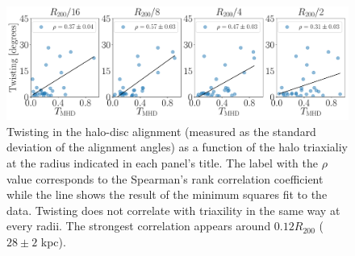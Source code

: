 \documentclass[usenatbib]{mnras}
\begin{document}
\begin{figure}
\begin{center}
\includegraphics[width=1.0\textwidth]{correlations_twisting_triaxiality_MHD.pdf}
\end{center}
\caption{Twisting in the halo-disc alignment (measured as the standard deviation of the alignment angles)
  as a function of the halo triaxialiy at the radius indicated
  in each panel's title.
  The label with the $\rho$ value corresponds to the Spearman's rank
  correlation coefficient while the line shows the result of the
  minimum squares fit to the data.
  Twisting does not correlate with triaxility in the same way at every
  radii. The strongest correlation appears around $0.12R_{200}$ ($28\pm2$ kpc).} 
\label{fig:alignment_correlations}
\end{figure}
\end{document}
